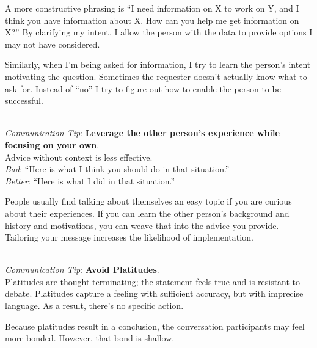 A more constructive phrasing is ``I need information on X to work on Y, and I think you have information about X. How can you help me get information on X?'' By clarifying my intent, I allow the person with the data to provide options I may not have considered.

Similarly, when I'm being asked for information, I try to learn the person's intent motivating the question. Sometimes the requester doesn't actually know what to ask for. Instead of ``no'' I try to figure out how to enable the person to be successful. 

\ \\
\textit{Communication Tip}: \textbf{Leverage the other person's experience while focusing on your own\label{sec:advice}}.\\
Advice without context is less effective.\\
\textit{Bad}: ``Here is what I think you should do in that situation.''\\
\textit{Better}: ``Here is what I did in that situation.''

People usually find talking about themselves an easy topic if you are curious about their experiences. 
If you can learn the other person's background and history and motivations, you can weave that into the advice you provide. 
Tailoring your message increases the likelihood of implementation. 

\ \\
\textit{Communication Tip}: 
\textbf{Avoid Platitudes\label{sec:platitudes}}.\\
\href{https://en.wikipedia.org/wiki/Platitude}{Platitudes}
are \gls{thought terminating}; 
the statement feels true and is resistant to debate. Platitudes capture a feeling with sufficient accuracy, but with imprecise language. As a result, there's no specific action.

Because platitudes result in a conclusion, the conversation participants may feel more bonded. However, that bond is shallow.

